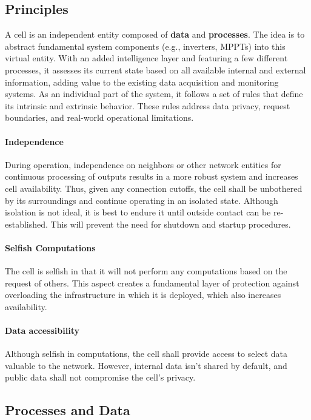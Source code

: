 \subsection{Principles}

A cell is an independent entity composed of \textbf{data} and \textbf{processes}. The idea is to abstract fundamental system components (e.g., inverters, MPPTs) into this virtual entity. With an added intelligence layer and featuring a few different processes, it assesses its current state based on all available internal and external information, adding value to the existing data acquisition and monitoring systems. As an individual part of the system, it follows a set of rules that define its intrinsic and extrinsic behavior. These rules address data privacy, request boundaries, and real-world operational limitations.

\paragraph*{Independence} During operation, independence on neighbors or other network entities for continuous processing of outputs results in a more robust system and increases cell availability. Thus, given any connection cutoffs, the cell shall be unbothered by its surroundings and continue operating in an isolated state. Although isolation is not ideal, it is best to endure it until outside contact can be re-established. This will prevent the need for shutdown and startup procedures.

\paragraph*{Selfish Computations} The cell is selfish in that it will not perform any computations based on the request of others. This aspect creates a fundamental layer of protection against overloading the infrastructure in which it is deployed, which also increases availability.

\paragraph*{Data accessibility} Although selfish in computations, the cell shall provide access to select data valuable to the network. However, internal data isn't shared by default, and public data shall not compromise the cell's privacy.

\subsection{Processes and Data}

